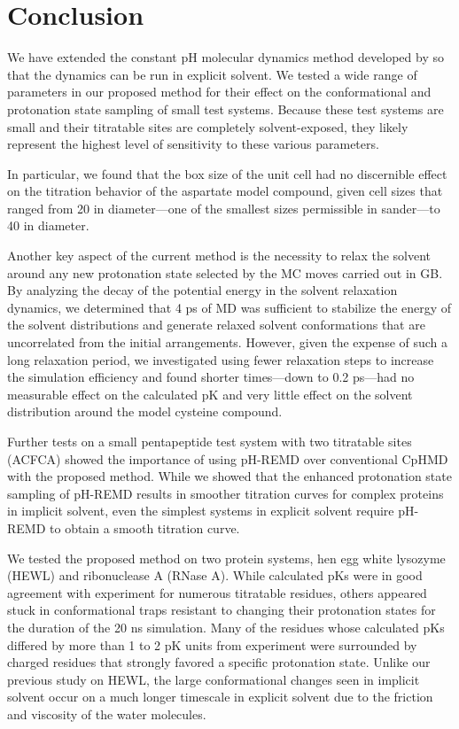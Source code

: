 \section{Conclusion}

We have extended the constant pH molecular dynamics method developed by
\citeauthor{Mongan_JComputChem_2004_v25_p2038}
\cite{Mongan_JComputChem_2004_v25_p2038} so that the dynamics can be run in
explicit solvent. We tested a wide range of parameters in our proposed method
for their effect on the conformational and protonation state sampling of small
test systems. Because these test systems are small and their titratable sites
are completely solvent-exposed, they likely represent the highest level of
sensitivity to these various parameters.

In particular, we found that the box size of the unit cell had no discernible
effect on the titration behavior of the aspartate model compound, given cell
sizes that ranged from 20 \text{\AA} in diameter---one of the smallest sizes
permissible in sander---to 40 \text{\AA} in diameter.

Another key aspect of the current method is the necessity to relax the solvent
around any new protonation state selected by the MC moves carried out in GB. By
analyzing the decay of the potential energy in the solvent relaxation dynamics,
we determined that 4 ps of MD was sufficient to stabilize the energy of the
solvent distributions and generate relaxed solvent conformations that are
uncorrelated from the initial arrangements. However, given the expense of such a
long relaxation period, we investigated using fewer relaxation steps to increase
the simulation efficiency and found shorter times---down to 0.2 ps---had no
measurable effect on the calculated pK and very little effect on the
solvent distribution around the model cysteine compound.

Further tests on a small pentapeptide test system with two titratable sites
(ACFCA) showed the importance of using pH-REMD over conventional CpHMD with the
proposed method. While we showed that the enhanced protonation state sampling of
pH-REMD results in smoother titration curves for complex proteins in implicit
solvent, \cite{Swails_JChemTheoryComput_2012_v8_p4393} even the simplest systems
in explicit solvent require pH-REMD to obtain a smooth titration curve.

We tested the proposed method on two protein systems, hen egg white lysozyme
(HEWL) and ribonuclease A (RNase A). While calculated pKs were in good
agreement with experiment for numerous titratable residues, others appeared
stuck in conformational traps resistant to changing their protonation states for
the duration of the 20 ns simulation. Many of the residues whose calculated
pKs differed by more than 1 to 2 pK units from experiment were
surrounded by charged residues that strongly favored a specific protonation
state.  Unlike our previous study on HEWL,
\cite{Swails_JChemTheoryComput_2012_v8_p4393} the large conformational changes
seen in implicit solvent occur on a much longer timescale in explicit solvent
due to the friction and viscosity of the water molecules.

